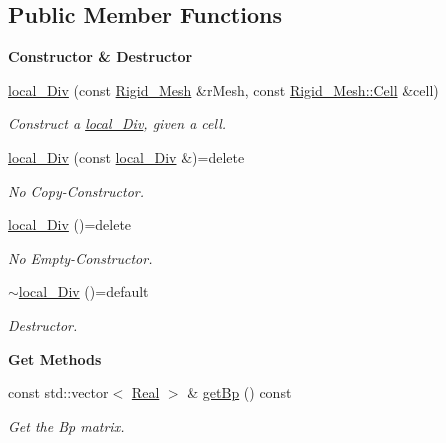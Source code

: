 \subsection*{Public Member Functions}
\begin{Indent}{\bf Constructor \& Destructor}\par
\begin{DoxyCompactItemize}
\item 
\hyperlink{classFVCode3D_1_1local__Div_ac694c9494b555a05f76ad7a8f1054ef0}{local\+\_\+\+Div} (const \hyperlink{classFVCode3D_1_1Rigid__Mesh}{Rigid\+\_\+\+Mesh} \&r\+Mesh, const \hyperlink{classFVCode3D_1_1Rigid__Mesh_1_1Cell}{Rigid\+\_\+\+Mesh\+::\+Cell} \&cell)
\begin{DoxyCompactList}\small\item\em Construct a \hyperlink{classFVCode3D_1_1local__Div}{local\+\_\+\+Div}, given a cell. \end{DoxyCompactList}\item 
\hyperlink{classFVCode3D_1_1local__Div_a8b60cd4ce5c57666dcd789f88bf4c878}{local\+\_\+\+Div} (const \hyperlink{classFVCode3D_1_1local__Div}{local\+\_\+\+Div} \&)=delete
\begin{DoxyCompactList}\small\item\em No Copy-\/\+Constructor. \end{DoxyCompactList}\item 
\hyperlink{classFVCode3D_1_1local__Div_a2055fe43c88bfae8cec9fc23d164d8de}{local\+\_\+\+Div} ()=delete
\begin{DoxyCompactList}\small\item\em No Empty-\/\+Constructor. \end{DoxyCompactList}\item 
\hyperlink{classFVCode3D_1_1local__Div_afa9074811abe8144670c22a8ac6cb1bd}{$\sim$local\+\_\+\+Div} ()=default
\begin{DoxyCompactList}\small\item\em Destructor. \end{DoxyCompactList}\end{DoxyCompactItemize}
\end{Indent}
\begin{Indent}{\bf Get Methods}\par
\begin{DoxyCompactItemize}
\item 
const std\+::vector$<$ \hyperlink{namespaceFVCode3D_a40c1f5588a248569d80aa5f867080e83}{Real} $>$ \& \hyperlink{classFVCode3D_1_1local__Div_aaed22251b9f77eec2f0ea5321cfb8ad5}{get\+Bp} () const 
\begin{DoxyCompactList}\small\item\em Get the Bp matrix. \end{DoxyCompactList}\end{DoxyCompactItemize}
\end{Indent}
